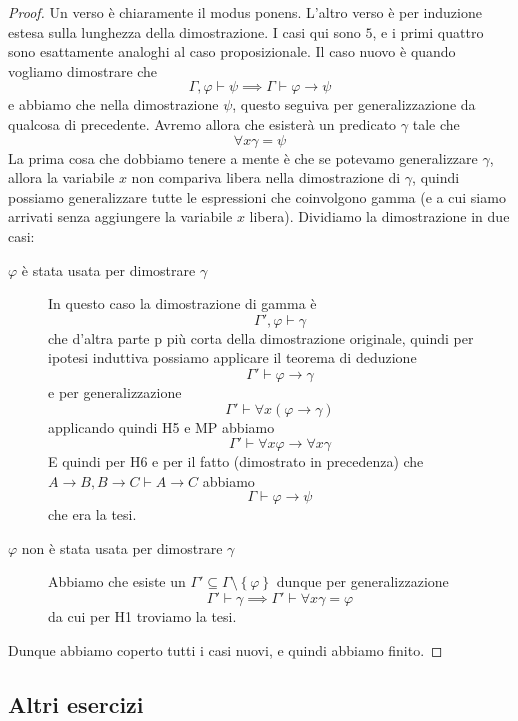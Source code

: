 \documentclass[11pt]{scrartcl}
\begin{document}
	\begin{proof}
		Un verso è chiaramente il modus ponens. L'altro verso è per induzione estesa sulla lunghezza della dimostrazione. I casi qui sono $5$, e i primi quattro sono esattamente analoghi al caso proposizionale. Il caso nuovo è quando vogliamo dimostrare che 
		$$\Gamma,\varphi \vdash \psi \implies \Gamma \vdash \varphi \to \psi$$
		e abbiamo che nella dimostrazione $\psi$, questo seguiva per generalizzazione da qualcosa di precedente. Avremo allora che esisterà un predicato $\gamma$ tale che 
		$$\forall x\gamma = \psi$$ 
		La prima cosa che dobbiamo tenere a mente è che se potevamo generalizzare $\gamma$, allora la variabile $x$ non compariva libera nella dimostrazione di $\gamma$, quindi possiamo generalizzare tutte le espressioni che coinvolgono gamma (e a cui siamo arrivati senza aggiungere la variabile $x$ libera). Dividiamo la dimostrazione in due casi:
		\begin{description}
			\item[$\varphi$ è stata usata per dimostrare $\gamma$] In questo caso la dimostrazione di gamma è
			$$\Gamma',\varphi\vdash \gamma$$
			che d'altra parte p più corta della dimostrazione originale, quindi per ipotesi induttiva possiamo applicare il teorema di deduzione
			$$\Gamma'\vdash \varphi \to \gamma$$
			e per generalizzazione
			$$\Gamma' \vdash \forall x ( \varphi \to \gamma)$$
			applicando quindi H5 e MP abbiamo
			$$\Gamma' \vdash \forall x  \varphi \to \forall x\gamma$$
			E quindi per H6 e per il fatto (dimostrato in precedenza) che $A\to B, B\to C \vdash A \to C$ abbiamo
			$$\Gamma \vdash \varphi \to \psi$$
			che era la tesi.
			\item[$\varphi$ non è stata usata per dimostrare $\gamma$] Abbiamo che esiste un $\Gamma'\subseteq \Gamma\setminus \left\{\varphi\right\}$ dunque per generalizzazione
			$$\Gamma'\vdash \gamma \implies \Gamma' \vdash \forall x\gamma = \varphi$$
			da cui per H1 troviamo la tesi.
		\end{description}
		Dunque abbiamo coperto tutti i casi nuovi, e quindi abbiamo finito.
	\end{proof}
	
	\subsection{Altri esercizi}
	
\end{document}
